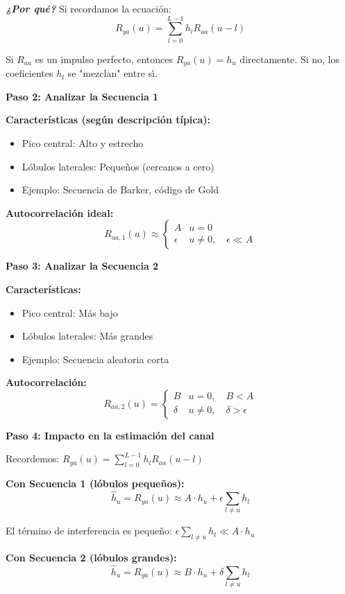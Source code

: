 \documentclass[11pt,a4paper]{article}
\begin{document}
\textit{\textbf{¿Por qu\'e?}} Si recordamos la ecuaci\'on:
\[
R_{ya}(u) = \sum_{l=0}^{L-1} h_l R_{aa}(u-l)
\]

Si $R_{aa}$ es un impulso perfecto, entonces $R_{ya}(u) = h_u$ directamente. Si no, los coeficientes $h_l$ se "mezclan" entre s\'{\i}.

\textbf{Paso 2: Analizar la Secuencia 1}

\textbf{Caracter\'isticas (seg\'un descripci\'on t\'ipica):}
\begin{itemize}
    \item Pico central: Alto y estrecho
    \item L\'obulos laterales: Peque\~nos (cercanos a cero)
    \item Ejemplo: Secuencia de Barker, c\'odigo de Gold
\end{itemize}

\textbf{Autocorrelaci\'on ideal:}
\[
R_{aa,1}(u) \approx \begin{cases}
A & u = 0 \\
\epsilon & u \neq 0, \quad \epsilon \ll A
\end{cases}
\]

\textbf{Paso 3: Analizar la Secuencia 2}

\textbf{Caracter\'isticas:}
\begin{itemize}
    \item Pico central: M\'as bajo
    \item L\'obulos laterales: M\'as grandes
    \item Ejemplo: Secuencia aleatoria corta
\end{itemize}

\textbf{Autocorrelaci\'on:}
\[
R_{aa,2}(u) = \begin{cases}
B & u = 0, \quad B < A \\
\delta & u \neq 0, \quad \delta > \epsilon
\end{cases}
\]

\textbf{Paso 4: Impacto en la estimaci\'on del canal}

Recordemos: $R_{ya}(u) = \sum_{l=0}^{L-1} h_l R_{aa}(u-l)$

\textbf{Con Secuencia 1 (l\'obulos peque\~nos):}
\[
\hat{h}_u = R_{ya}(u) \approx A \cdot h_u + \epsilon \sum_{l \neq u} h_l
\]

El t\'ermino de interferencia es peque\~no: $\epsilon \sum_{l \neq u} h_l \ll A \cdot h_u$

\textbf{Con Secuencia 2 (l\'obulos grandes):}
\[
\hat{h}_u = R_{ya}(u) \approx B \cdot h_u + \delta \sum_{l \neq u} h_l
\]
\end{document}
